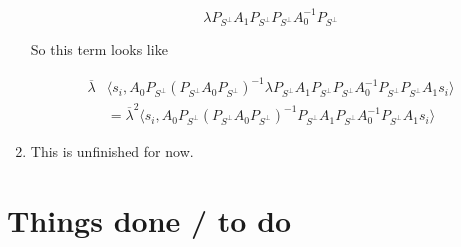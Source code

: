 \documentclass[12pt]{article}
\begin{document}
\begin{enumerate}
\[
\lambda P_{S^\perp} A_1 P_{S^\perp}P_{S^\perp}A_0^{-1}P_{S^\perp}
\]

So this term looks like 

\begin{align*}
\overline{\lambda} &\langle s_i, A_0 P_{S^\perp} ( P_{S^\perp} A_0 P_{S^\perp})^{-1} \lambda P_{S^\perp} A_1 P_{S^\perp}P_{S^\perp}A_0^{-1}P_{S^\perp} P_{S^\perp} A_1 s_i \rangle \\
&= \overline{\lambda}^2 \langle s_i, A_0 P_{S^\perp} ( P_{S^\perp} A_0 P_{S^\perp})^{-1} P_{S^\perp} A_1 P_{S^\perp} A_0^{-1} P_{S^\perp} A_1 s_i \rangle 
\end{align*}

\item This is unfinished for now.

\end{enumerate}

\section*{Things done / to do}
\end{document}
